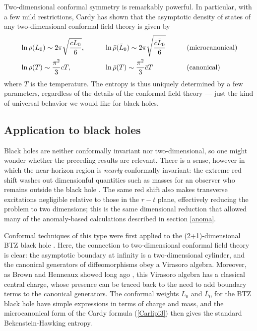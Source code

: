 \documentclass[11pt]{article}
\begin{document}
Two-dimensional conformal symmetry is remarkably powerful.  In particular,
with a few mild restrictions, Cardy has shown that the asymptotic density of
states of any two-dimensional conformal field theory is given by \cite{Cardy,Cardy2}
\begin{alignat}{5}
&\ln\rho(L_0) \sim 2\pi\sqrt{\frac{cL_0}{6}}, \qquad 
&&\ln{\bar\rho}({\bar L}_0) \sim 2\pi\sqrt{\frac{{\bar c}{\bar L}_0}{6}} \qquad
&&\hbox{(microcanonical)} \nonumber\\
&\ln\rho(T) \sim \frac{\pi^2}{3}cT, \qquad 
&&\ln{\bar\rho}(T) \sim \frac{\pi^2}{3}{\bar c}T
&&\hbox{(canonical)}
\label{Carlipi3}
\end{alignat}
where $T$ is the temperature.  The entropy is thus uniquely determined by a 
few parameters, regardless of the details of the conformal field theory --- just 
the kind of universal behavior we would like for black holes.

\subsection{Application to black holes}

Black holes are neither conformally invariant nor two-dimensional, so one
might wonder whether the preceding results are relevant. There is a sense,
however in which the near-horizon region is \emph{nearly}  conformally
 invariant: the extreme red shift washes out dimensionful quantities such
as masses for an observer who remains outside the black hole \cite{Camblong}.
The same red shift also makes transverse excitations negligible relative to 
those in the $r-t$ plane, effectively reducing the problem to two dimensions; 
this is the same dimensional reduction that allowed many of the anomaly-based
calculations described in section \ref{anoma}.

Conformal techniques of this type were first applied to the (2+1)-dimensional
BTZ black hole \cite{Strominger,BSS}.  Here, the connection to two-dimensional
conformal field theory is clear: the asymptotic boundary at infinity is a 
two-dimensional cylinder, and the canonical generators of diffeomorphisms
obey a Virasoro algebra.  Moreover, as Brown and Henneaux showed long
ago \cite{BrownHen}, this Virasoro algebra has a classical central charge,
whose presence can be traced back to the need to add boundary terms to
the canonical generators.  The conformal weights $L_0$ and ${\bar L}_0$ 
for the BTZ black hole have simple expressions in terms of charge and 
mass, and the microcanonical form of the Cardy formula (\ref{Carlipi3}) 
then gives the standard Bekenstein-Hawking entropy.
\end{document}
